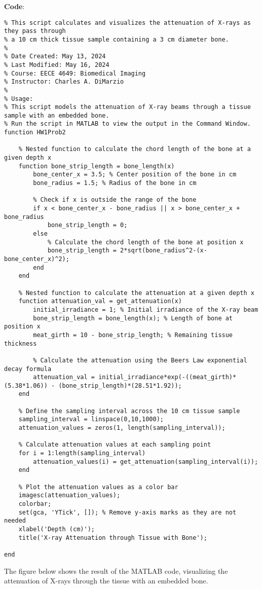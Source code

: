 \documentclass[12pt]{article}
\begin{document}
\textbf{Code}:
\begin{lstlisting}[style=Matlab-editor]
% X-ray Attenuation through Tissue with Bone
% This script calculates and visualizes the attenuation of X-rays as they pass through
% a 10 cm thick tissue sample containing a 3 cm diameter bone.
%
% Date Created: May 13, 2024
% Last Modified: May 16, 2024
% Course: EECE 4649: Biomedical Imaging
% Instructor: Charles A. DiMarzio
%
% Usage:
% This script models the attenuation of X-ray beams through a tissue sample with an embedded bone.
% Run the script in MATLAB to view the output in the Command Window.
function HW1Prob2

    % Nested function to calculate the chord length of the bone at a given depth x
    function bone_strip_length = bone_length(x)
        bone_center_x = 3.5; % Center position of the bone in cm
        bone_radius = 1.5; % Radius of the bone in cm

        % Check if x is outside the range of the bone
        if x < bone_center_x - bone_radius || x > bone_center_x + bone_radius
            bone_strip_length = 0;
        else
            % Calculate the chord length of the bone at position x
            bone_strip_length = 2*sqrt(bone_radius^2-(x-bone_center_x)^2);
        end
    end

    % Nested function to calculate the attenuation at a given depth x
    function attenuation_val = get_attenuation(x)
        initial_irradiance = 1; % Initial irradiance of the X-ray beam
        bone_strip_length = bone_length(x); % Length of bone at position x
        meat_girth = 10 - bone_strip_length; % Remaining tissue thickness

        % Calculate the attenuation using the Beers Law exponential decay formula
        attenuation_val = initial_irradiance*exp(-((meat_girth)*(5.38*1.06)) - (bone_strip_length)*(28.51*1.92));
    end

    % Define the sampling interval across the 10 cm tissue sample
    sampling_interval = linspace(0,10,1000);
    attenuation_values = zeros(1, length(sampling_interval));

    % Calculate attenuation values at each sampling point
    for i = 1:length(sampling_interval)
        attenuation_values(i) = get_attenuation(sampling_interval(i));
    end
    
    % Plot the attenuation values as a color bar
    imagesc(attenuation_values);
    colorbar;
    set(gca, 'YTick', []); % Remove y-axis marks as they are not needed
    xlabel('Depth (cm)');
    title('X-ray Attenuation through Tissue with Bone');

end
\end{lstlisting}
The figure below shows the result of the MATLAB code, visualizing the attenuation of X-rays through the tissue with an embedded bone.
\end{document}
